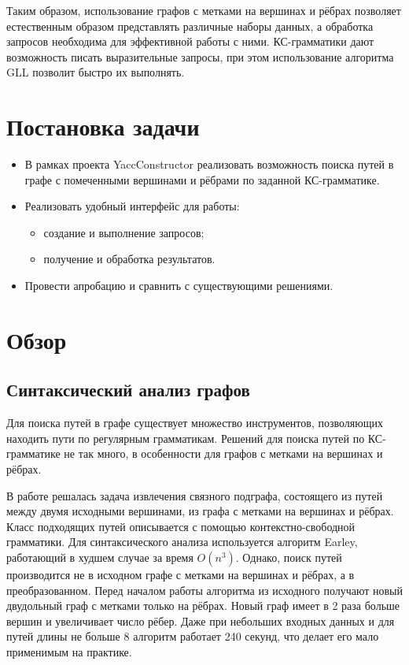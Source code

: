 \documentclass[14pt]{matmex-diploma}
\begin{document}
  Таким образом, использование графов с метками на вершинах и рёбрах позволяет естественным образом представлять различные наборы данных, а обработка запросов необходима для эффективной работы с ними. КС-грамматики дают возможность писать выразительные запросы, при этом использование алгоритма GLL позволит быстро их выполнять.

\section{Постановка задачи}
\begin{itemize}
    \item В рамках проекта YaccConstructor \cite{YaccConstructorPage} реализовать возможность поиска путей в графе с помеченными вершинами и рёбрами по заданной КС-грамматике.
    \item Реализовать удобный интерфейс для работы:
    \begin{itemize}
    \item создание и выполнение запросов;
    \item получение и обработка результатов.
    \end{itemize}
    \item Провести апробацию и сравнить с существующими решениями.
    
\end{itemize}

\section{Обзор}

\subsection{Синтаксический анализ графов}

Для поиска путей в графе существует множество инструментов, позволяющих находить пути по регулярным грамматикам. Решений для поиска путей по КС-грамматике не так много, в особенности для графов с метками на вершинах и рёбрах.

В работе \cite{subgraph} решалась задача извлечения связного подграфа, состоящего из путей между двумя исходными вершинами, из графа с метками на вершинах и рёбрах. Класс подходящих путей описывается с помощью контекстно-свободной грамматики. Для синтаксического анализа используется алгоритм Earley, работающий в худшем случае за время $O(n^3)$. Однако, поиск путей производится не в исходном графе с метками на вершинах и рёбрах, а в преобразованном. Перед началом работы алгоритма из исходного получают новый двудольный граф с метками только на рёбрах. Новый граф имеет в 2 раза больше вершин и увеличивает число рёбер. Даже при небольших входных данных и для путей длины не больше 8 алгоритм работает 240 секунд, что делает его мало применимым на практике.
\end{document}
